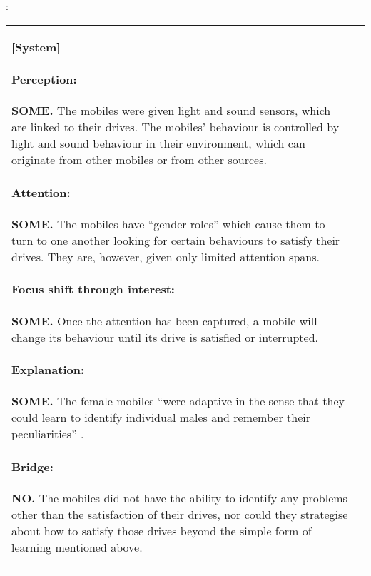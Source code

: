 \begin{table}
\begin{mdframed}
: 
\begin{tabular}{@{\hspace{-0.01\textwidth}}p{}@{\hspace{.02\textwidth}}p{}}
\begin{minipage}{.48\textwidth}
\textbf{[System]}
\paragraph{Perception:} \textbf{SOME.}
The mobiles were given light and sound sensors, which are linked to their drives.
The mobiles' behaviour is controlled by light and sound behaviour in their
environment, which can originate from other mobiles or from other sources.
\paragraph{Attention:} \textbf{SOME.}
The mobiles have ``gender roles'' which cause them to turn to one another
looking for certain behaviours to satisfy their drives.  They are, however,
given only limited attention spans.
\paragraph{Focus shift through interest:} \textbf{SOME.} Once the attention
has been captured, a mobile will change its behaviour until its drive
is satisfied or interrupted.
\paragraph{Explanation:}
\textbf{SOME.}  The female mobiles ``were adaptive in the sense that
they could learn to identify individual males and remember their
peculiarities''  \cite{pickering2007ontological}.
\paragraph{Bridge:} \textbf{NO.} The mobiles did not have
the ability to identify any problems other than the satisfaction of
their drives, nor could they strategise about how to satisfy those
drives beyond the simple form of learning mentioned above.

\end{minipage}
\end{tabular}
\end{mdframed}
\end{table}
